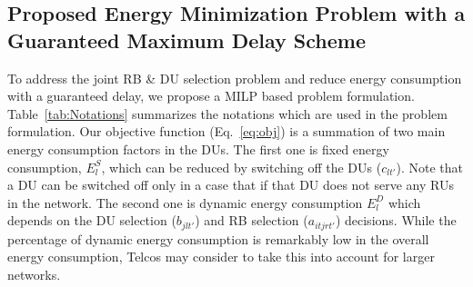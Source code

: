 \documentclass[conference]{IEEEtran}
\begin{document}
\subsection{Proposed Energy Minimization Problem with a Guaranteed Maximum Delay Scheme}
To address the joint RB \& DU selection problem and reduce energy consumption with a guaranteed delay, we propose a MILP based problem formulation. Table~\ref{tab:Notations} summarizes the notations which are used in the problem formulation. Our objective function (Eq.~\ref{eq:obj}) is a summation of two main energy consumption factors in the DUs. The first one is fixed energy consumption, $E^{S}_{l}$, which can be reduced by switching off the DUs ($c_{lt'}$).  Note that a DU can be switched off only in a case that if that DU does not serve any RUs in the network. The second one is dynamic energy consumption $E^{D}_{l}$ which depends on the DU selection ($b_{jlt'}$) and RB selection ($a_{itjrt'}$) decisions.  %
While the percentage of dynamic energy consumption is remarkably low in the overall energy consumption, Telcos may consider to take this into account for larger networks.
\end{document}
